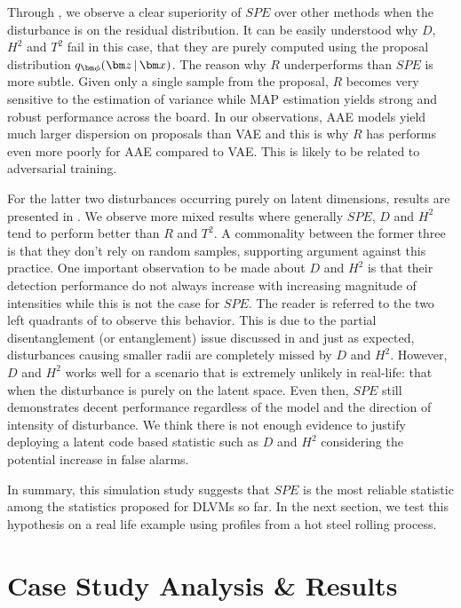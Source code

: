 \documentclass[journal, peerreview]{IEEEtran}
\begin{document}
Through , we observe a clear superiority of $SPE$ over other methods when the disturbance is on the residual distribution.
It can be easily understood why $D$, $H^2$ and $T^2$ fail in this case, that they are purely computed using the proposal distribution $\encoding$.
The reason why $R$ underperforms than $SPE$ is more subtle. 
Given only a single sample from the proposal, $R$ becomes very sensitive to the estimation of variance while MAP estimation yields strong and robust performance across the board.
In our observations, AAE models yield much larger dispersion on proposals than VAE and this is why $R$ has performs even more poorly for AAE compared to VAE.
This is likely to be related to adversarial training.

For the latter two disturbances occurring purely on latent dimensions, results are presented in .
We observe more mixed results where generally $SPE$, $D$ and $H^2$ tend to perform better than $R$ and $T^2$.
A commonality between the former three is that they don't rely on random samples, supporting argument against this practice.
One important observation to be made about $D$ and $H^2$ is that their detection performance do not always increase with increasing magnitude of intensities while this is not the case for $SPE$.
The reader is referred to the two left quadrants of  to observe this behavior.
This is due to the partial disentanglement (or entanglement) issue discussed in  and just as expected, disturbances causing smaller radii are completely missed by $D$ and $H^2$.
However, $D$ and $H^2$ works well for a scenario that is extremely unlikely in real-life: that when the disturbance is purely on the latent space. Even then, $SPE$ still demonstrates decent performance regardless of the model and the direction of intensity of disturbance.
We think there is not enough evidence to justify deploying a latent code based statistic such as $D$ and $H^2$ considering the potential increase in false alarms.

In summary, this simulation study suggests that $SPE$ is the most reliable statistic among the statistics proposed for DLVMs so far.
In the next section, we test this hypothesis on a real life example using profiles from a hot steel rolling process.

\section{Case Study Analysis \& Results}
\label{sec:case-study}
\end{document}
